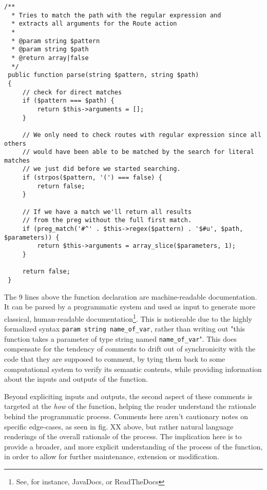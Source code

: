   \begin{lstlisting}[caption={Route.php}, label={route.php}, float, floatplacement=H]
  /**
  * Tries to match the path with the regular expression and
  * extracts all arguments for the Route action
  *
  * @param string $pattern
  * @param string $path
  * @return array|false
  */
 public function parse(string $pattern, string $path)
 {
     // check for direct matches
     if ($pattern === $path) {
         return $this->arguments = [];
     }

     // We only need to check routes with regular expression since all others
     // would have been able to be matched by the search for literal matches
     // we just did before we started searching.
     if (strpos($pattern, '(') === false) {
         return false;
     }

     // If we have a match we'll return all results
     // from the preg without the full first match.
     if (preg_match('#^' . $this->regex($pattern) . '$#u', $path, $parameters)) {
         return $this->arguments = array_slice($parameters, 1);
     }

     return false;
 }
\end{lstlisting}

The 9 lines above the function declaration are machine-readable documentation. It can be parsed by a programmatic system and used as input to generate more classical, human-readable documentation\footnote{See, for instance, JavaDocs, or ReadTheDocs}. This is noticeable due to the highly formalized syntax \lstinline{param string name_of_var}, rather than writing out "this function takes a parameter of type string named \lstinline{name_of_var}". This does compensate for the tendency of comments to drift out of synchronicity with the code that they are supposed to comment, by tying them back to some computational system to verify its semantic contents, while providing information about the inputs and outputs of the function.

Beyond expliciting inputs and outputs, the second aspect of these comments is targeted at the \emph{how} of the function, helping the reader understand the rationale behind the programmatic process. Comments here aren't cautionary notes on specific edge-cases, as seen in fig. XX above, but rather natural language renderings of the overall rationale of the process. The implication here is to provide a broader, and more explicit understanding of the process of the function, in order to allow for further maintenance, extension or modification.

